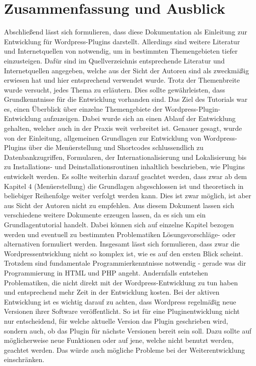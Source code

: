 \section{Zusammenfassung und Ausblick}\label{fazit}
Abschließend lässt sich formulieren, dass diese Dokumentation als Einleitung zur Entwicklung für Wordpress-Plugins darstellt. \newline
Allerdings sind weitere Literatur und Internetquellen von notwendig, um in bestimmten Themengebieten tiefer einzusteigen.\newline
Dafür sind im Quellverzeichnis entsprechende Literatur und Internetquellen angegeben, welche aus der Sicht der Autoren sind als zweckmäßig erwiesen hat und hier entsprechend verwendet wurde. Trotz der Themenbreite wurde versucht, jedes Thema zu erläutern. Dies sollte gewährleisten, dass Grundkenntnisse für die Entwicklung vorhanden sind.\newline
Das Ziel des Tutorials war es, einen Überblick über einzelne Themengebiete der Wordpress-Plugin-Entwicklung aufzuzeigen. Dabei wurde sich an einen Ablauf der Entwicklung gehalten, welcher auch in der Praxis weit verbreitet ist. Genauer gesagt, wurde von der Einleitung, allgemeinen Grundlagen zur Entwicklung von Wordpress-Plugins über die Menüerstellung und Shortcodes schlussendlich zu Datenbankzugriffen, Formularen, der Internationalisierung und Lokalisierung bis zu Installations- und Deinstallationsroutinen inhaltlich beschrieben, wie Plugins entwickelt werden. Es sollte weiterhin darauf geachtet werden, dass zwar ab dem Kapitel 4 (Menüerstellung) die Grundlagen abgeschlossen ist und theoretisch in beliebiger Reihenfolge weiter verfolgt werden kann.  Dies ist zwar möglich, ist aber aus Sicht der Autoren nicht zu empfehlen.\newline
Aus diesem Dokument lassen sich verschiedene weitere Dokumente erzeugen lassen, da es sich um ein Grundlagentutorial handelt. Dabei können sich auf einzelne Kapitel bezogen werden und eventuell zu bestimmten Problematiken Lösungsvorschläge- oder alternativen formuliert werden.\newline
Insgesamt lässt sich formulieren, dass zwar die Wordpressentwicklung nicht so komplex ist, wie es auf den ersten Blick scheint. Trotzdem sind fundamentale Programmierkenntnisse notwendig - gerade was dir Programmierung in HTML und PHP angeht. Andernfalls entstehen Problematiken, die nicht direkt mit der Wordpress-Entwicklung zu tun haben und entsprechend mehr Zeit in der Entwicklung kosten.\newline
Bei der aktiven Entwicklung ist es wichtig darauf zu achten, dass Wordpress regelmäßig neue Versionen ihrer Software veröffentlicht. So ist für eine Pluginentwicklung nicht nur entscheidend, für welche aktuelle Version das Plugin geschrieben wird, sondern auch, ob das Plugin für nächste Versionen bereit sein soll. Dazu sollte auf möglicherweise neue Funktionen oder auf jene, welche nicht benutzt werden, geachtet werden. Das würde auch mögliche Probleme bei der Weiterentwicklung einschränken.\newline

